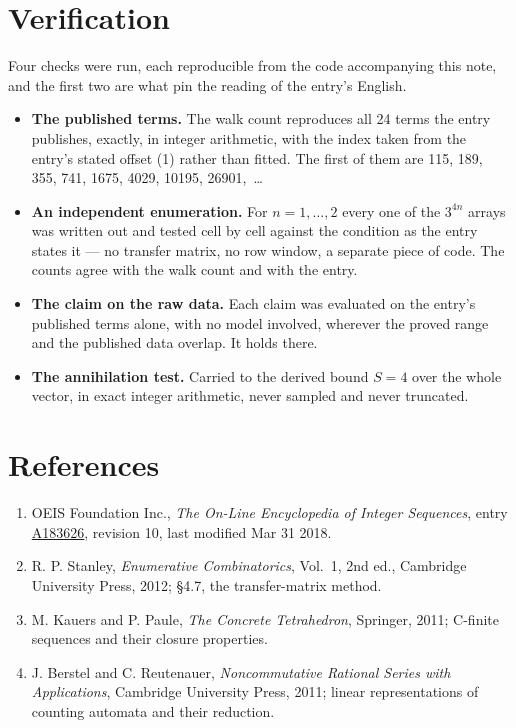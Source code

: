 \documentclass[11pt]{article}
\theoremstyle{definition}
\begin{document}
\section{Verification}

Four checks were run, each reproducible from the code accompanying this note, and the first two are what pin the reading of the entry's English.

\begin{itemize}

\item {\bfseries The published terms.} The walk count reproduces all 24 terms the entry publishes, exactly, in integer arithmetic, with the index taken from the entry's stated offset (1) rather than fitted. The first of them are 115, 189, 355, 741, 1675, 4029, 10195, 26901,~\dots

\item {\bfseries An independent enumeration.} For $n = 1,\dots,2$ every one of the $3^{4n}$ arrays was written out and tested cell by cell against the condition as the entry states it --- no transfer matrix, no row window, a separate piece of code. The counts agree with the walk count and with the entry.

\item {\bfseries The claim on the raw data.} Each claim was evaluated on the entry's published terms alone, with no model involved, wherever the proved range and the published data overlap. It holds there.

\item {\bfseries The annihilation test.} Carried to the derived bound $S = 4$ over the whole vector, in exact integer arithmetic, never sampled and never truncated.

\end{itemize}

\section{References}

\begin{enumerate}

\item OEIS Foundation Inc., \emph{The On-Line Encyclopedia of Integer Sequences}, entry \href{https://oeis.org/A183626}{A183626}, revision 10, last modified Mar 31 2018.

\item R. P. Stanley, \emph{Enumerative Combinatorics}, Vol.~1, 2nd ed., Cambridge University Press, 2012; \S4.7, the transfer-matrix method.

\item M. Kauers and P. Paule, \emph{The Concrete Tetrahedron}, Springer, 2011; C-finite sequences and their closure properties.

\item J. Berstel and C. Reutenauer, \emph{Noncommutative Rational Series with Applications}, Cambridge University Press, 2011; linear representations of counting automata and their reduction.

\end{enumerate}
\end{document}
